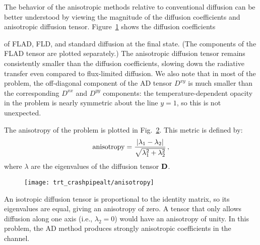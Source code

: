 The behavior of the anisotropic methods relative to conventional
diffusion can be better understood by viewing the magnitude of the
diffusion coefficients and anisotropic diffusion tensor.
Figure~\ref{fig:crashaltDcoeff} shows the diffusion coefficients
%
\begin{figure}[htb]
  \centering\small
  \label{fig:crashaltDcoeff}
\end{figure}
%
of FLAD, FLD, and standard diffusion at the final state. (The components of the
FLAD tensor are plotted separately.)
The anisotropic diffusion tensor
remains consistently smaller than the diffusion coefficients, slowing down the
radiative transfer even compared to flux-limited diffusion. We also note that in
most of the problem, the off-diagonal component of the AD tensor $D^{xy}$ is
much smaller than the corresponding $D^{xx}$ and $D^{yy}$ components: the
temperature-dependent opacity in the problem is nearly symmetric about the line
$y=1$, so this is not unexpected.

The anisotropy of the problem is plotted in Fig.~\ref{fig:crashaltAnisotropy}.
This metric is defined by:
\begin{equation}\label{eq:anisotropyMetric}
  \text{anisotropy} = \frac{\left| \lambda_1 - \lambda_2 \right| }{ \sqrt{
  \lambda_1^2 + \lambda_2^2} }\,,
\end{equation}
where $\lambda$ are the eigenvalues of the diffusion tensor $\mathbf{D}$.
%
\begin{figure}[htb]
  \centering
  \texttt{[image: trt\_crashpipealt/anisotropy]}
  \label{fig:crashaltAnisotropy}
\end{figure}
%
An isotropic diffusion tensor is proportional to the identity matrix, so its
eigenvalues are equal, giving an anisotropy of zero. A tensor that only allows
diffusion along one axis (i.e., $\lambda_2 = 0$) would have an anisotropy of
unity. In this problem, the AD method produces strongly anisotropic coefficients
in the channel.

